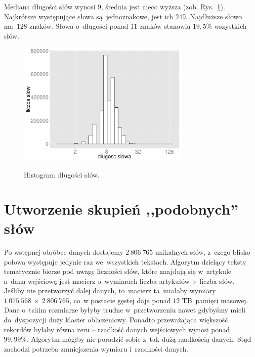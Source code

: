 \documentclass{praca1}
\begin{document}
Mediana długości słów wynosi $9$, średnia jest nieco wyższa (zob. Rys.~\ref{plot:003}). Najkrótsze występujące słowa są~jednoznakowe, jest ich $249$. Najdłuższe słowo ma~$128$ znaków. Słowa o~długości ponad $11$ znaków stanowią $19{,}5\%$ wszystkich słów.

\begin{figure}[!h]
  \centering
  \includegraphics[width=240pt]{plot3.pdf}\\
  \caption{Histogram długości słów.}\label{plot:003}
\end{figure}


\section{Utworzenie skupień ,,podobnych'' słów}

Po wstępnej obróbce danych dostajemy $2\ 806\ 765$ unikalnych słów, z~czego blisko połowa występuje jedynie raz we~wszystkich tekstach. Algorytm dzielący teksty tematycznie bierze pod uwagę liczności słów, które znajdują się w~artykule a~daną wejściową jest macierz o~wymiarach liczba artykułów $\times$ liczba słów. Jeśliby nie przetworzyć dalej danych, to~macierz ta~miałaby wymiary $1\ 075\ 568\ \times\ 2\ 806\ 765$, co~w postacie gęstej daje ponad $12$ TB~pamięci masowej. Dane o~takim rozmiarze byłyby trudne w~przetworzeniu nawet gdybyśmy mieli do~dyspozycji duży klaster obliczeniowy. Ponadto przeważająca większość rekordów byłaby równa zeru -- rzadkość danych wejściowych wynosi ponad $99{,}99\%$. Algorytm mógłby nie poradzić sobie z~tak dużą rzadkością danych. Stąd zachodzi potrzeba zmniejszenia wymiaru i~rzadkości danych.
\end{document}
